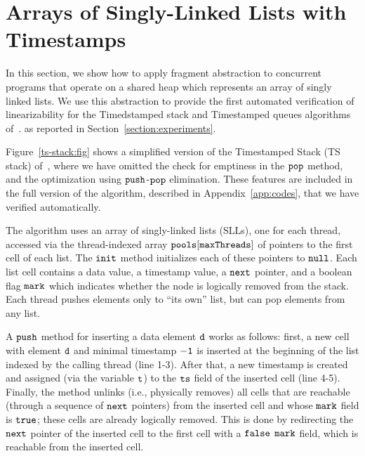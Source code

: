 \section{Arrays of Singly-Linked Lists with Timestamps}
\label{sec:ts}

In this section, we show how to apply fragment abstraction to concurrent
programs that  operate on a shared heap which represents
an array of singly linked lists.
We use this abstraction to provide the first automated verification of
linearizability for the Timedstamped stack and
Timestamped queues algorithms of~\cite{ts-stack}. 
as reported in Section~\ref{section:experiments}.




Figure~\ref{ts-stack:fig} shows a simplified version of the Timestamped Stack (TS stack) of~\cite{ts-stack}, where we have omitted the check for emptiness in the ${\tt pop}$ method, and the optimization using ${\tt push}$-${\tt pop}$ elimination. These features are included in the full version of the algorithm, described in Appendix~\ref{app:codes}, that we have verified automatically.

The algorithm uses an array of singly-linked lists (SLLs), one for each thread, accessed via the thread-indexed array ${\tt pools[maxThreads]}$ of pointers to the first cell of each list. The ${\tt init}$ method initializes each of these pointers to ${\tt null}$. Each list cell contains a data value, a timestamp value, a ${\tt next}$ pointer, and a boolean flag ${\tt mark}$ which indicates whether the node is logically removed from the stack. Each thread pushes elements only to ``its own'' list, but can pop elements from any list.

A ${\tt push}$ method for inserting a data element ${\tt d}$ works as follows: first, a new cell with element ${\tt d}$ and minimal timestamp ${\tt -1}$ is inserted at the beginning of the list indexed by the calling thread (line 1-3). After that, a new timestamp is created and assigned (via the variable ${\tt t}$) to the ${\tt ts}$ field of the inserted cell (line 4-5).
Finally, the method unlinks (i.e., physically removes) all cells that are reachable (through a sequence of $\tt next$ pointers) from the inserted cell and whose ${\tt mark}$ field is ${\tt true}$; these cells are already logically removed. This is done by redirecting the $\tt next$ pointer of the inserted cell to the first cell with a ${\tt false}$ $\tt mark$ field, which is
reachable from the inserted cell.

